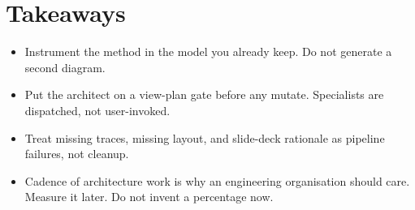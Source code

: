 \documentclass[10pt,journal,compsoc]{IEEEtran}
\begin{document}
\section{Takeaways}

\begin{itemize}
\item Instrument the method in the model you already keep. Do not generate a second diagram.
\item Put the architect on a view-plan gate before any mutate. Specialists are dispatched, not user-invoked.
\item Treat missing traces, missing layout, and slide-deck rationale as pipeline failures, not cleanup.
\item Cadence of architecture work is why an engineering organisation should care. Measure it later. Do not invent a percentage now.
\end{itemize}



\end{document}
